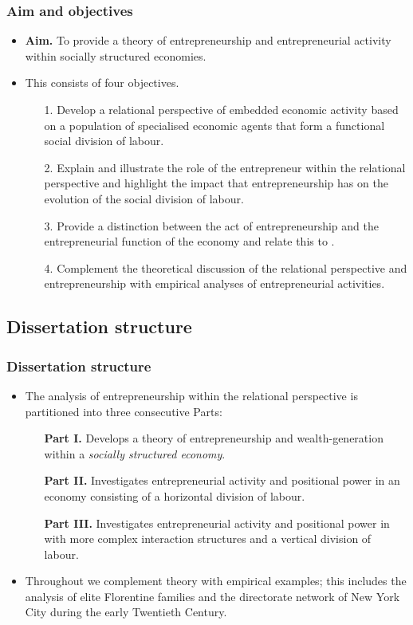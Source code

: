 \documentclass[10pt]{beamer}
\begin{document}
\begin{frame} \frametitle{Aim and objectives}
\begin{itemize}
\item \textbf{Aim.} To provide a theory of entrepreneurship and entrepreneurial activity within socially structured economies.
\medskip
\item This consists of four objectives.
\begin{itemize}
\medskip
\item[1.] Develop a relational perspective of embedded economic activity based on a population of specialised economic agents that form a functional social division of labour.
\medskip
\item[2.] Explain and illustrate the role of the entrepreneur within the relational perspective and highlight the impact that entrepreneurship has on the evolution of the social division of labour.
\medskip
\item[3.] Provide a distinction between the act of entrepreneurship and the entrepreneurial function of the economy and relate this to .
\medskip
\item[4.] Complement the theoretical discussion of the relational perspective and entrepreneurship with empirical analyses of entrepreneurial activities.
\end{itemize}
\end{itemize}
\end{frame}

\subsection{Dissertation structure}

\begin{frame} \frametitle{Dissertation structure}
\begin{itemize}
\item The analysis of entrepreneurship within the relational perspective is partitioned into three consecutive Parts:
\begin{itemize}
\medskip
\item[\textbf{Part I.}] Develops a theory of entrepreneurship and wealth-generation within a \emph{socially structured economy}.
\medskip
\item[\textbf{Part II.}] Investigates entrepreneurial activity and positional power in an economy consisting of a horizontal division of labour.
\medskip
\item[\textbf{Part III.}] Investigates entrepreneurial activity and positional power in with more complex interaction structures and a vertical division of labour.
\end{itemize}
\medskip
\item Throughout we complement theory with empirical examples; this includes the analysis of elite Florentine families and the directorate network of New York City during the early Twentieth Century.
\end{itemize}
\end{frame}
\end{document}
